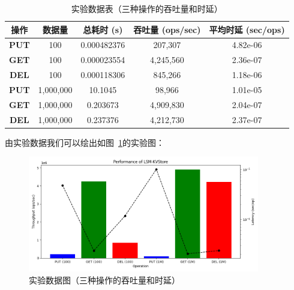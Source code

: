 \documentclass[fontset=windows]{article}
\begin{document}
	\begin{table}[h!]
		\centering
			\begin{tabular}{|c|c|c|c|c|}
				\hline
				\textbf{操作}  & \textbf{数据量} & \textbf{总耗时 (s)} & \textbf{吞吐量 (ops/sec)} & \textbf{平均时延 (sec/ops})\\ \hline
				\textbf{PUT}                      & 100                               & 0.000482376                           & 207,307                                     & 4.82e-06 \\ \hline
				\textbf{GET}                      & 100                               & 0.000023554                           & 4,245,560                                   & 2.36e-07 \\ \hline
				\textbf{DEL}                      & 100                               & 0.000118306                           & 845,266                                     & 1.18e-06 \\ \hline
				\textbf{PUT}                      & 1,000,000                         & 10.1045                               & 98,966                                      & 1.01e-05 \\ \hline
				\textbf{GET}                      & 1,000,000                         & 0.203673                              & 4,909,830                                   & 2.04e-07 \\ \hline
				\textbf{DEL}                      & 1,000,000                         & 0.237376                              & 4,212,730                                   & 2.37e-07 \\ \hline
			\end{tabular}
			\caption{实验数据表（三种操作的吞吐量和时延）}
			\label{tab:performance1}
		\end{table}
		
		由实验数据我们可以绘出如图~\ref{fig:performance1}的实验图：
		
		\begin{figure}[H]
				\centering
				\includegraphics[width=0.9\textwidth]{Figure_1.png}
				\caption{实验数据图（三种操作的吞吐量和时延）}
				\label{fig:performance1}
			\end{figure}
			
\end{document}
